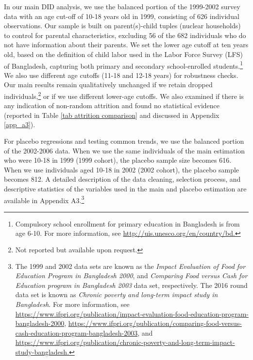 \documentclass[12pt,letterpaper]{article}
\newcommand{\0}{\ensuremath{\mbox{\boldmath $0$}}}
\begin{document}
In our main DID analysis, we use the balanced portion of the 1999-2002 survey data with an age cut-off of 10-18 years old in 1999, consisting of 626 individual observations. Our sample is built on parent(s)-child tuples (nuclear households) to control for parental characteristics, excluding 56 of the 682 individuals who do not have information about their parents. We set the lower age cutoff at ten years old, based on the definition of child labor used in the Labor Force Survey (LFS) of Bangladesh, capturing both primary and secondary school-enrolled students.\footnote{Compulsory school enrollment for primary education in Bangladesh is from age 6-10. For more information, see \url{http://uis.unesco.org/en/country/bd.} } We also use different age cutoffs (11-18 and 12-18 years) for robustness checks. Our main results remain qualitatively unchanged if we retain dropped individuals,\footnote{Not reported but available upon request.} or if we use different lower-age cutoffs. We also examined if there is any indication of non-random attrition and found no statistical evidence (reported in Table \ref{tab attrition comparison} and discussed in Appendix \ref{app_a3}).

For placebo regressions and testing common trends, we use the balanced portion of the 2002-2006 data. When we use the same individuals of the main estimation who were 10-18 in 1999 (1999 cohort), the placebo sample size becomes 616. When we use individuals aged 10-18 in 2002 (2002 cohort), the placebo sample becomes 812. A detailed description of the data cleaning, selection process, and descriptive statistics of the variables used in the main and placebo estimation are available in Appendix A3.\footnote{The 1999 and 2002 data sets are known as the \textit{Impact Evaluation of Food for Education Program in Bangladesh 2000}, and \textit{Comparing Food versus Cash for Education program in Bangladesh 2003} data set, respectively. The 2016 round data set is known as \textit{Chronic poverty and long-term impact study in Bangladesh}. For more information, see \url{https://www.ifpri.org/publication/impact-evaluation-food-education-program-bangladesh-2000}, \url{https://www.ifpri.org/publication/comparing-food-versus-cash-education-program-bangladesh-2003}, and \url{https://www.ifpri.org/publication/chronic-poverty-and-long-term-impact-study-bangladesh.} }
\end{document}
